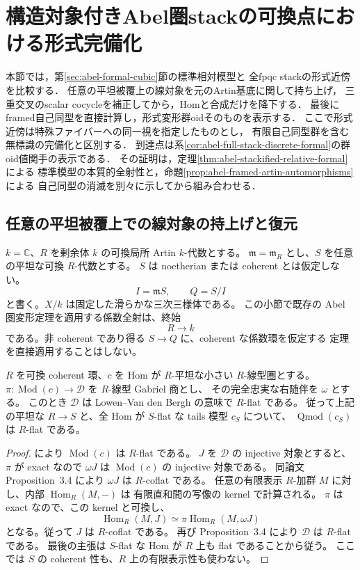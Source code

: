 \section{構造対象付きAbel圏stackの可換点における形式完備化}
\label{sec:abel-formal-descent}

本節では，第\ref{sec:abel-formal-cubic}節の標準相対模型と
全fpqc stackの形式近傍を比較する．
任意の平坦被覆上の線対象を元のArtin基底に関して持ち上げ，
三重交叉のscalar cocycleを補正してから，Homと合成だけを降下する．
最後にframed自己同型を直接計算し，形式変形群oidそのものを表示する．
ここで形式近傍は特殊ファイバーへの同一視を指定したものとし，
有限自己同型群を含む無標識の完備化と区別する．
到達点は系\ref{cor:abel-full-stack-discrete-formal}の群oid値関手の表示である．
その証明は，定理\ref{thm:abel-stackified-relative-formal}による
標準模型の本質的全射性と，命題\ref{prop:abel-framed-artin-automorphisms}による
自己同型の消滅を別々に示してから組み合わせる．

\subsection{任意の平坦被覆上での線対象の持上げと復元}
\label{subsec:abel-flat-cover-reconstruction}

$k=\mathbb C$、$R$ を剰余体 $k$ の可換局所 Artin $k$-代数とする。
$\mathfrak m=\mathfrak m_R$ とし、$S$ を任意の平坦な可換 $R$-代数とする。
$S$ は noetherian または coherent とは仮定しない。
\[
 I=\mathfrak mS,\qquad Q=S/I
\]
と書く。$X/k$ は固定した滑らかな三次三様体である。
この小節で既存の Abel 圏変形定理を適用する係数全射は、終始
\[
 R\longrightarrow k
\]
である。非 coherent であり得る $S\to Q$ に、coherent な係数環を仮定する
定理を直接適用することはしない。

\begin{lemma}
\label{lem:abel-flat-quotient-over-artin}
$R$ を可換 coherent 環、$c$ を Hom が $R$-平坦な小さい $R$-線型圏とする。
$\pi:\operatorname{Mod}(c)\to\mathcal D$ を $R$-線型 Gabriel 商とし、
その完全忠実な右随伴を $\omega$ とする。
このとき $\mathcal D$ は Lowen--Van den Bergh の意味で $R$-flat である。
従って上記の平坦な $R\to S$ と、全 Hom が $S$-flat な tails 模型 $c_S$ について、
$\operatorname{Qmod}(c_S)$ は $R$-flat である。
\end{lemma}

\begin{proof}
\cite[Proposition~3.7]{LowenVdBDeformation} により
$\operatorname{Mod}(c)$ は $R$-flat である。
$J$ を $\mathcal D$ の injective 対象とすると、$\pi$ が exact なので
$\omega J$ は $\operatorname{Mod}(c)$ の injective 対象である。
同論文 Proposition~3.4 により $\omega J$ は $R$-coflat である。
任意の有限表示 $R$-加群 $M$ に対し、内部 $\operatorname{Hom}_R(M,-)$ は
有限直和間の写像の kernel で計算される。
$\pi$ は exact なので、この kernel と可換し、
\[
 \operatorname{Hom}_R(M,J)
 \simeq\pi\operatorname{Hom}_R(M,\omega J)
\]
となる。従って $J$ は $R$-coflat である。
再び Proposition~3.4 により $\mathcal D$ は $R$-flat である。
最後の主張は $S$-flat な Hom が $R$ 上も flat であることから従う。
ここでは $S$ の coherent 性も、$R$ 上の有限表示性も使わない。
\end{proof}

